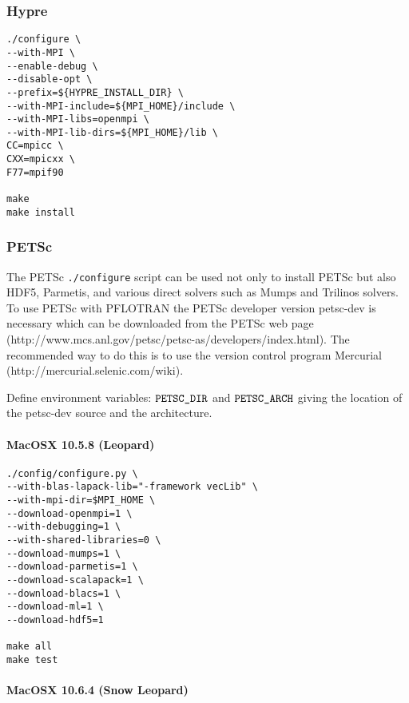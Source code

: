 \documentclass[12pt]{article}
\begin{document}
\subsubsection{Hypre}

\begin{verbatim}
./configure \
--with-MPI \
--enable-debug \
--disable-opt \
--prefix=${HYPRE_INSTALL_DIR} \
--with-MPI-include=${MPI_HOME}/include \
--with-MPI-libs=openmpi \
--with-MPI-lib-dirs=${MPI_HOME}/lib \
CC=mpicc \
CXX=mpicxx \
F77=mpif90

make
make install
\end{verbatim}

\subsubsection{PETSc}

The PETSc {\tt ./configure} script can be used not only to install PETSc but also HDF5, Parmetis, and various direct solvers such as Mumps and Trilinos solvers. To use PETSc with PFLOTRAN the PETSc developer version petsc-dev is necessary which can be downloaded from the PETSc web page (http://www.mcs.anl.gov/petsc/petsc-as/developers/index.html). The recommended way to do this is to use the version control program Mercurial \linebreak (http://mercurial.selenic.com/wiki).

Define environment variables: $\verb|PETSC_DIR|$ and $\verb|PETSC_ARCH|$ giving the location of the petsc-dev source and the architecture.

\paragraph{MacOSX 10.5.8 (Leopard)}

\begin{verbatim}
./config/configure.py \
--with-blas-lapack-lib="-framework vecLib" \
--with-mpi-dir=$MPI_HOME \
--download-openmpi=1 \
--with-debugging=1 \
--with-shared-libraries=0 \
--download-mumps=1 \
--download-parmetis=1 \
--download-scalapack=1 \
--download-blacs=1 \
--download-ml=1 \
--download-hdf5=1 

make all
make test
\end{verbatim}

\paragraph{MacOSX 10.6.4 (Snow Leopard)}
\end{document}

